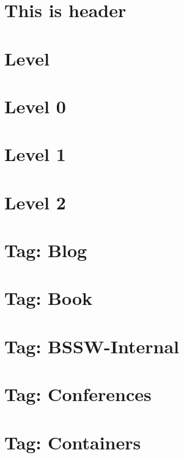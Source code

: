 \documentclass[twoside]{book}
\newcommand{\+}{\discretionary{\mbox{\scriptsize$\hookleftarrow$}}{}{}}
\begin{document}
\chapter{This is header}
\label{md_markdown_intro1}

\chapter{Level}
\label{md_markdown_level}

\chapter{Level 0}
\label{md_markdown_level0}

\chapter{Level 1}
\label{md_markdown_level1}

\chapter{Level 2}
\label{md_markdown_level2}

\chapter{Tag\+: Blog}
\label{md_markdown_tag_blog}

\chapter{Tag\+: Book}
\label{md_markdown_tag_book}

\chapter{Tag\+: B\+S\+S\+W-\/\+Internal}
\label{md_markdown_tag_bssw-internal}

\chapter{Tag\+: Conferences}
\label{md_markdown_tag_conferences}

\chapter{Tag\+: Containers}
\label{md_markdown_tag_containers}

\end{document}
